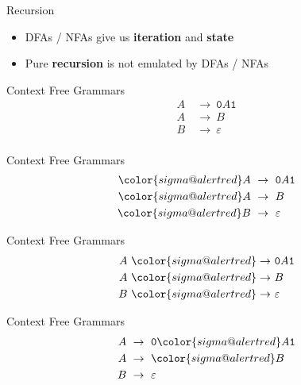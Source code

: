 \documentclass[aspectratio=169]{beamer}
\begin{document}
\begin{frame}{Recursion}
    \begin{itemize}
        \item DFAs / NFAs give us \textbf{iteration} and \textbf{state} \pause
        \item Pure \textbf{recursion} is not emulated by DFAs / NFAs
    \end{itemize}
\end{frame}

\begin{frame}{Context Free Grammars}
    {
    \LARGE
    \vspace{20pt}
    \begin{align*}
        A ~&\to~ \texttt{0}A\texttt{1} \\
        A ~&\to~ B                     \\
        B ~&\to~ \varepsilon           \\
    \end{align*}
    }
\end{frame}

\begin{frame}{Context Free Grammars}
    {
    \LARGE
    \vspace{20pt}
    \begin{align*}
        {\color{sigma@alertred}A} ~&\to~ \texttt{0}A\texttt{1} \\
        {\color{sigma@alertred}A} ~&\to~ B                     \\
        {\color{sigma@alertred}B} ~&\to~ \varepsilon           \\
    \end{align*}
    }
\end{frame}

\begin{frame}{Context Free Grammars}
    {
    \LARGE
    \vspace{20pt}
    \begin{align*}
        A ~&{\color{sigma@alertred}\to}~ \texttt{0}A\texttt{1} \\
        A ~&{\color{sigma@alertred}\to}~ B                     \\
        B ~&{\color{sigma@alertred}\to}~ \varepsilon           \\
    \end{align*}
    }
\end{frame}

\begin{frame}{Context Free Grammars}
    {
    \LARGE
    \vspace{20pt}
    \begin{align*}
        A ~&\to~ \texttt{0}{\color{sigma@alertred}A}\texttt{1} \\
        A ~&\to~ {\color{sigma@alertred}B}                     \\
        B ~&\to~ \varepsilon           \\
    \end{align*}
    }
\end{frame}
\end{document}
